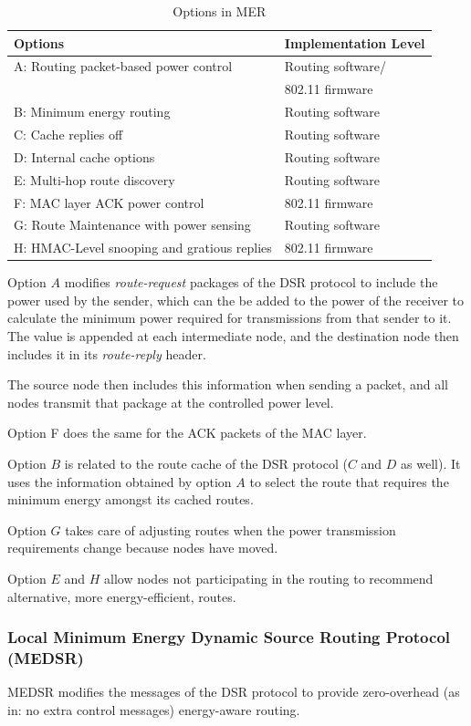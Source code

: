 \begin{table}[b]
  \begin{tabular}{ll}
    Options & Implementation Level  \\
    \hline
    A: Routing packet-based power control & Routing software/\\ &802.11 firmware \\
    B: Minimum energy routing & Routing software \\
    C: Cache replies off & Routing software \\
    D: Internal cache options & Routing software \\
    E: Multi-hop route discovery & Routing software \\
    F: MAC layer ACK power control & 802.11 firmware \\
    G: Route Maintenance with power sensing & Routing software \\
    H: HMAC-Level snooping and gratious replies & 802.11 firmware \\
  \end{tabular}
  \caption{Options in MER}
  \label{tbl:mer-options}
\end{table}

Option $A$ modifies \textit{route-request} packages of the DSR protocol to
include the power used by the sender, which can the be added to the power
of the receiver to calculate the minimum power required for transmissions
from that sender to it. The value is appended at each intermediate node, and the
destination node then includes it in its \textit{route-reply} header.

The source node then includes this information when sending a packet, and
all nodes transmit that package at the controlled power level.

Option F does the same for the ACK packets of the MAC layer.

Option $B$ is related to the route cache of the DSR protocol ($C$ and $D$ as well). It
uses the information obtained by option $A$ to select the route that requires
the minimum energy amongst its cached routes.

Option $G$ takes care of adjusting routes when the power transmission requirements
change because nodes have moved.

Option $E$ and $H$ allow nodes not participating in the routing to recommend
alternative, more energy-efficient, routes.
\subsubsection{Local Minimum Energy Dynamic Source Routing Protocol (MEDSR)}
MEDSR\cite{tanque2007minimum} modifies the messages of the DSR protocol to
provide zero-overhead (as in: no extra control messages) energy-aware routing.

